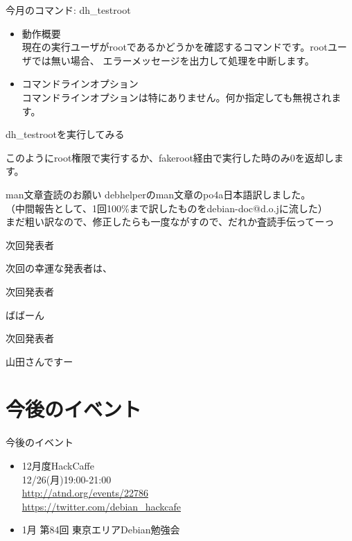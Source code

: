 \begin{frame}{今月のコマンド: dh\_testroot}
\begin{itemize}
\item 動作概要\\
現在の実行ユーザがrootであるかどうかを確認するコマンドです。rootユーザでは無い場合、
エラーメッセージを出力して処理を中断します。
\item コマンドラインオプション\\
コマンドラインオプションは特にありません。何か指定しても無視されます。
\end{itemize}
\end{frame}
\begin{frame}[containsverbatim]{dh\_testrootを実行してみる}
このようにroot権限で実行するか、fakeroot経由で実行した時のみ0を返却します。
\end{frame}
\begin{frame}{man文章査読のお願い}
debhelperのman文章のpo4a日本語訳しました。\\
（中間報告として、1回100\%まで訳したものをdebian-doc@d.o.jに流した）\\
まだ粗い訳なので、修正したらも一度ながすので、だれか査読手伝ってーっ\\
\end{frame}

\begin{frame}{次回発表者}
\begin{center}
次回の幸運な発表者は、
\end{center}
\end{frame}
\begin{frame}{次回発表者}
\begin{center}
ばばーん
\end{center}
\end{frame}
\begin{frame}{次回発表者}
\begin{center}
山田さんですー
\end{center}
\end{frame}
\section{今後のイベント}
\begin{frame}{今後のイベント}
 
\begin{itemize}
 \item 12月度HackCaffe\\
12/26(月)19:00-21:00\\
\url{http://atnd.org/events/22786}\\
\url{https://twitter.com/debian_hackcafe}
 \item 1月 第84回 東京エリアDebian勉強会
\end{itemize}
\end{frame}

